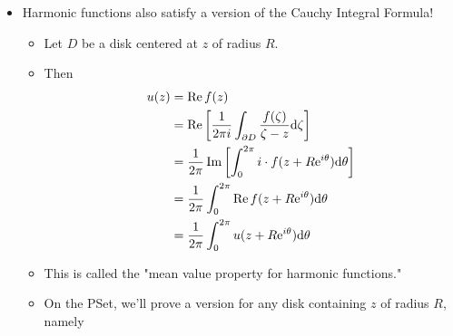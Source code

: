 \documentclass[../notes.tex]{subfiles}
\begin{document}
\begin{itemize}
    \begin{proof}
        Since $u$ is harmonic,
        \begin{equation*}
            0 = \Delta u
            = \pdv{\bar{z}}(\pdv{u}{z})
        \end{equation*}
        This means that $u_z$ is holomorphic! This combined with the fact that $U$ is convex (hence star-shaped) implies by the CIT that $\int_\gamma u_z\dd{z}=0$ for any closed loop $\gamma\subset U$. Thus, by the proposition associated with Figure \ref{fig:contLoopInteg}, there exists a primitive $g$ for $u_z$ on $U$. From here, it follows by the rules of complex differentiation that
        \begin{equation*}
            \pdv{z}(\re g) = \pdv{z}\left[ \frac{1}{2}(g+\bar{g}) \right]
            = \frac{1}{2}\pdv{g}{z}
            = \frac{1}{2}u_z
        \end{equation*}
        and
        \begin{equation*}
            \pdv{\bar{z}}(\re g) = \frac{1}{2}\overline{g_z}
            = \frac{1}{2}u_{\bar{z}}
        \end{equation*}
        Therefore, $u=\re(2g)+C$, as desired.
    \end{proof}
    \item Harmonic functions also satisfy a version of the Cauchy Integral Formula!
    \begin{itemize}
        \item Let $D$ be a disk centered at $z$ of radius $R$.
        \item Then
        \begin{align*}
            u(z) &= \re f(z)\\
            &= \re\left[ \frac{1}{2\pi i}\int_{\partial D}\frac{f(\zeta)}{\zeta-z}\dd\zeta \right]\\
            &= \frac{1}{2\pi}\im\left[ \int_0^{2\pi}i\cdot f(z+R\e[i\theta])\dd\theta \right]\\
            &= \frac{1}{2\pi}\int_0^{2\pi}\re f(z+R\e[i\theta])\dd\theta\\
            &= \frac{1}{2\pi}\int_0^{2\pi}u(z+R\e[i\theta])\dd\theta
        \end{align*}
        \item This is called the "mean value property for harmonic functions."
        \item On the PSet, we'll prove a version for any disk containing $z$ of radius $R$, namely
        \begin{equation*}

\end{equation*}
\end{itemize}
\end{itemize}
\end{document}
